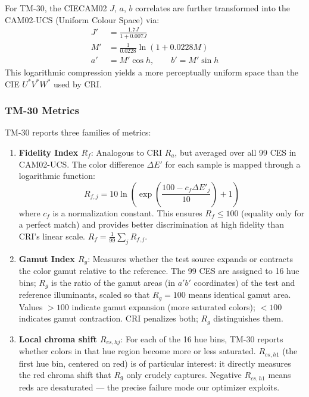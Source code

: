 \documentclass[11pt]{article}
\begin{document}
For TM-30, the CIECAM02 $J$, $a$, $b$ correlates are further transformed
into the CAM02-UCS (Uniform Colour Space) via:
\begin{align}
J' &= \frac{1.7 J}{1 + 0.007 J} \\
M' &= \frac{1}{0.0228} \ln(1 + 0.0228 M) \\
a' &= M' \cos h, \qquad b' = M' \sin h
\end{align}
This logarithmic compression yields a more perceptually uniform space
than the CIE $U^*V^*W^*$ used by CRI.

\subsubsection{TM-30 Metrics}

TM-30 reports three families of metrics:

\begin{enumerate}
\item \textbf{Fidelity Index $R_f$}: Analogous to CRI $R_a$, but
  averaged over all 99 CES in CAM02-UCS.  The color difference
  $\Delta E'$ for each sample is mapped through a logarithmic function:
  \begin{equation}
  R_{f,j} = 10 \ln\!\left(\exp\!\left(\frac{100 - c_f \Delta E'_j}{10}\right) + 1\right)
  \end{equation}
  where $c_f$ is a normalization constant.  This ensures $R_f \leq 100$
  (equality only for a perfect match) and provides better discrimination
  at high fidelity than CRI's linear scale.
  $R_f = \frac{1}{99}\sum_j R_{f,j}$.

\item \textbf{Gamut Index $R_g$}: Measures whether the test source
  expands or contracts the color gamut relative to the reference.
  The 99 CES are assigned to 16 hue bins; $R_g$ is the ratio of the
  gamut areas (in $a'b'$ coordinates) of the test and reference
  illuminants, scaled so that $R_g = 100$ means identical gamut area.
  Values $> 100$ indicate gamut expansion (more saturated colors);
  $< 100$ indicates gamut contraction.  CRI penalizes both; $R_g$
  distinguishes them.

\item \textbf{Local chroma shift $R_{cs,hj}$}: For each of the 16 hue
  bins, TM-30 reports whether colors in that hue region become more or
  less saturated.  $R_{cs,h1}$ (the first hue bin, centered on red) is
  of particular interest: it directly measures the red chroma shift that
  $R_9$ only crudely captures.  Negative $R_{cs,h1}$ means reds are
  desaturated --- the precise failure mode our optimizer exploits.
\end{enumerate}
\end{document}
